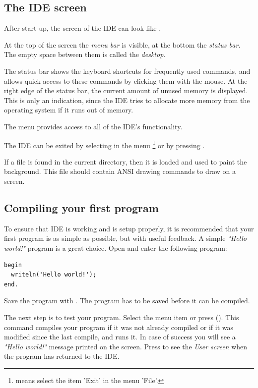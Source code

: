 \subsection{The IDE screen}

After start up, the screen of the IDE can look like .


At the top of the screen the \emph{menu bar} is visible, at the bottom
the \emph{status bar}. The empty space between them is called the
\emph{desktop}.

The status bar shows the keyboard shortcuts for frequently used
commands, and allows quick access to these commands by clicking
them with the mouse.
At the right edge of the status bar, the current amount of unused
memory is displayed. This is only an indication, since the IDE
tries to allocate more memory from the operating system if it
runs out of memory.

The menu provides access to all of the IDE's functionality.

The IDE can be exited by selecting  in the menu
\footnote{ means select the item 'Exit' in the menu 'File'.}
or by pressing .

\begin{remark}
If a file  is found in the current directory,
then it is loaded and used to paint the background.
This file should contain ANSI drawing commands to draw on a screen.
\end{remark}
%
%
\subsection{Compiling your first program}
To ensure that IDE is working and is setup properly, it is recommended that your
first program is as simple as possible, but with useful feedback.
A simple \emph{"Hello world!"} program is a great choice. Open  and
enter the following program: 
\begin{verbatim}
begin
  writeln('Hello world!');
end.
\end{verbatim}
Save the program with . The program has to be saved before it can be
compiled.

The next step is to test your program. Select the menu item  or press
 (). This command compiles your program if it was
not already compiled or if it was modified since the last compile, and runs it. 
In case of success you will see a \emph{"Hello world!"}
message printed on the screen. Press  to see the \emph{User screen}
when the program has returned to the IDE.

